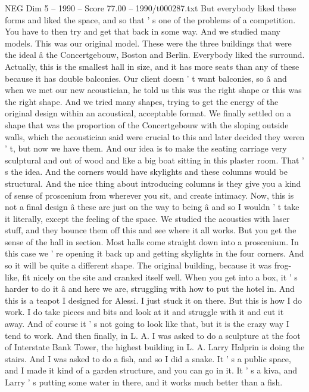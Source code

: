 \begin{textsample}{NEG Dim 5 – 1990 – Score 77.00 – 1990/t000287.txt}
But everybody liked these forms and liked the space, and so that ' s one of the problems of a competition.
You have to then try and get that back in some way.
And we studied many models.
This was our original model.
These were the three buildings that were the ideal â the Concertgebouw, Boston and Berlin.
Everybody liked the surround.
Actually, this is the smallest hall in size, and it has more seats than any of these because it has double balconies.
Our client doesn ' t want balconies, so â and when we met our new acoustician, he told us this was the right shape or this was the right shape.
And we tried many shapes, trying to get the energy of the original design within an acoustical, acceptable format.
We finally settled on a shape that was the proportion of the Concertgebouw with the sloping outside walls, which the acoustician said were crucial to this and later decided they weren ' t, but now we have them.
And our idea is to make the seating carriage very sculptural and out of wood and like a big boat sitting in this plaster room.
That ' s the idea.
And the corners would have skylights and these columns would be structural.
And the nice thing about introducing columns is they give you a kind of sense of proscenium from wherever you sit, and create intimacy.
Now, this is not a final design â these are just on the way to being â and so I wouldn ' t take it literally, except the feeling of the space.
We studied the acoustics with laser stuff, and they bounce them off this and see where it all works.
But you get the sense of the hall in section.
Most halls come straight down into a proscenium.
In this case we ' re opening it back up and getting skylights in the four corners.
And so it will be quite a different shape.
The original building, because it was frog-like, fit nicely on the site and cranked itself well.
When you get into a box, it ' s harder to do it â and here we are, struggling with how to put the hotel in.
And this is a teapot I designed for Alessi.
I just stuck it on there.
But this is how I do work.
I do take pieces and bits and look at it and struggle with it and cut it away.
And of course it ' s not going to look like that, but it is the crazy way I tend to work.
And then finally, in L.
A.
I was asked to do a sculpture at the foot of Interstate Bank Tower, the highest building in L.
A.
Larry Halprin is doing the stairs.
And I was asked to do a fish, and so I did a snake.
It ' s a public space, and I made it kind of a garden structure, and you can go in it.
It ' s a kiva, and Larry ' s putting some water in there, and it works much better than a fish.

\end{textsample}
